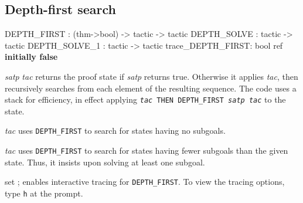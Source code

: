 \subsection{Depth-first search}
\begin{ttbox} 
DEPTH_FIRST   : (thm->bool) -> tactic -> tactic
DEPTH_SOLVE   :                tactic -> tactic
DEPTH_SOLVE_1 :                tactic -> tactic
trace_DEPTH_FIRST: bool ref \hfill{\bf initially false}
\end{ttbox}
\begin{ttdescription}
\item[\ttindexbold{DEPTH_FIRST} {\it satp} {\it tac}] 
returns the proof state if {\it satp} returns true.  Otherwise it applies
{\it tac}, then recursively searches from each element of the resulting
sequence.  The code uses a stack for efficiency, in effect applying
\hbox{\tt {\it tac} THEN DEPTH_FIRST {\it satp} {\it tac}} to the state.

\item[\ttindexbold{DEPTH_SOLVE} {\it tac}] 
uses {\tt DEPTH_FIRST} to search for states having no subgoals.

\item[\ttindexbold{DEPTH_SOLVE_1} {\it tac}] 
uses {\tt DEPTH_FIRST} to search for states having fewer subgoals than the
given state.  Thus, it insists upon solving at least one subgoal.

\item[set \ttindexbold{trace_DEPTH_FIRST};] 
enables interactive tracing for {\tt DEPTH_FIRST}.  To view the
tracing options, type {\tt h} at the prompt.
\end{ttdescription}


